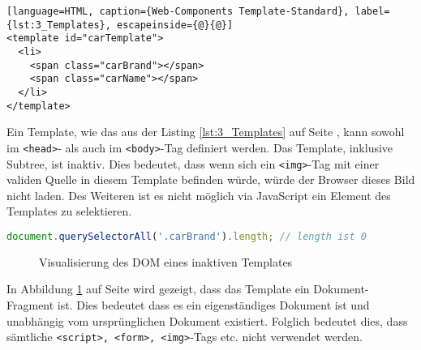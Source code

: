 \begin{lstlisting}[language=HTML, caption={Web-Components Template-Standard}, label={lst:3_Templates}, escapeinside={@}{@}]
<template id="carTemplate">
  <li>
    <span class="carBrand"></span>
    <span class="carName"></span>
  </li>
</template>
\end{lstlisting}

Ein Template, wie das aus der Listing \ref{lst:3_Templates} auf Seite \pageref{lst:3_Templates}, kann sowohl im \lstinline|<head>|- als auch im \lstinline|<body>|-Tag definiert werden. Das Template, inklusive Subtree, ist inaktiv. Dies bedeutet, dass wenn sich ein \lstinline|<img>|-Tag mit einer validen Quelle in diesem Template befinden würde, würde der Browser dieses Bild nicht laden. Des Weiteren ist es nicht möglich via JavaScript ein Element des Templates zu selektieren.
\begin{lstlisting}[language=JavaScript, caption={Beispiel-Selektor eines Elements in einem Template, das nicht aktiven DOM ist}, label={lst:3_Selector_Example}]
  document.querySelectorAll('.carBrand').length; // length ist 0
\end{lstlisting}

\begin{figure}[h]
\centering
\caption[
Visualisierung des DOM eines inaktiven Templates, Urldate: 04.2014 \newline
]{Visualisierung des DOM eines inaktiven Templates}
\label{fig:3_inactive_Template_DOM}
\end{figure}

In Abbildung \ref{fig:3_inactive_Template_DOM} auf Seite \pageref{fig:3_inactive_Template_DOM} wird gezeigt, dass das Template ein Dokument-Fragment ist. Dies bedeutet dass es ein eigenständiges Dokument ist und unabhängig vom ursprünglichen Dokument existiert. Folglich bedeutet dies, dass sämtliche \lstinline|<script>, <form>, <img>|-Tags etc. nicht verwendet werden.

